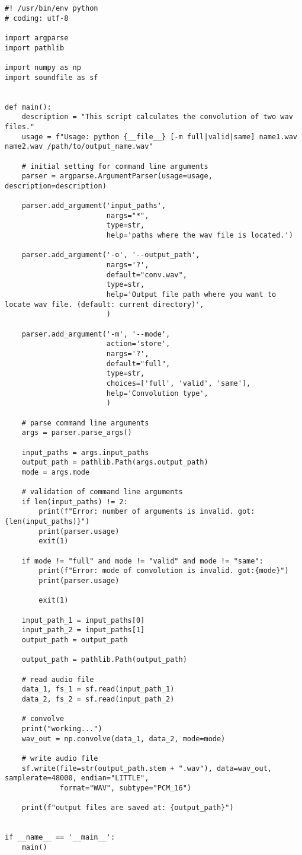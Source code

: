 \begin{lstlisting}[caption=calc\_convolution\_wav.py,label=calc_convolution_wav.py]
#! /usr/bin/env python
# coding: utf-8

import argparse
import pathlib

import numpy as np
import soundfile as sf


def main():
    description = "This script calculates the convolution of two wav files."
    usage = f"Usage: python {__file__} [-m full|valid|same] name1.wav name2.wav /path/to/output_name.wav"

    # initial setting for command line arguments
    parser = argparse.ArgumentParser(usage=usage, description=description)

    parser.add_argument('input_paths',
                        nargs="*",
                        type=str,
                        help='paths where the wav file is located.')

    parser.add_argument('-o', '--output_path',
                        nargs='?',
                        default="conv.wav",
                        type=str,
                        help='Output file path where you want to locate wav file. (default: current directory)',
                        )

    parser.add_argument('-m', '--mode',
                        action='store',
                        nargs='?',
                        default="full",
                        type=str,
                        choices=['full', 'valid', 'same'],
                        help='Convolution type',
                        )

    # parse command line arguments
    args = parser.parse_args()

    input_paths = args.input_paths
    output_path = pathlib.Path(args.output_path)
    mode = args.mode

    # validation of command line arguments
    if len(input_paths) != 2:
        print(f"Error: number of arguments is invalid. got:{len(input_paths)}")
        print(parser.usage)
        exit(1)

    if mode != "full" and mode != "valid" and mode != "same":
        print(f"Error: mode of convolution is invalid. got:{mode}")
        print(parser.usage)

        exit(1)

    input_path_1 = input_paths[0]
    input_path_2 = input_paths[1]
    output_path = output_path

    output_path = pathlib.Path(output_path)

    # read audio file
    data_1, fs_1 = sf.read(input_path_1)
    data_2, fs_2 = sf.read(input_path_2)

    # convolve
    print("working...")
    wav_out = np.convolve(data_1, data_2, mode=mode)

    # write audio file
    sf.write(file=str(output_path.stem + ".wav"), data=wav_out, samplerate=48000, endian="LITTLE",
             format="WAV", subtype="PCM_16")

    print(f"output files are saved at: {output_path}")


if __name__ == '__main__':
    main()
\end{lstlisting}

